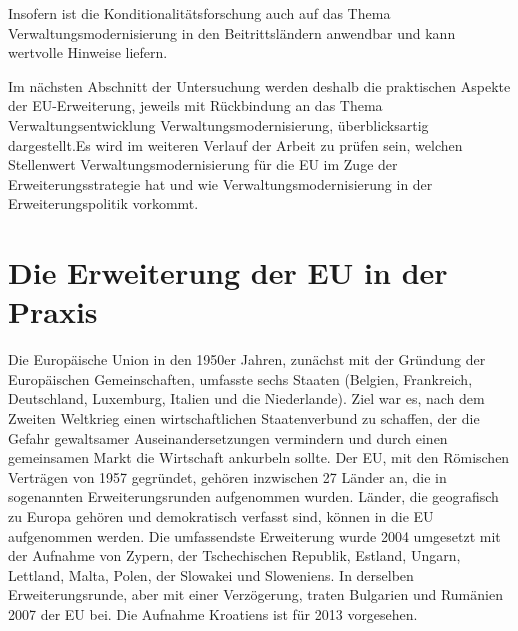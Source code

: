 Insofern ist die Konditionalitätsforschung auch auf das Thema Verwaltungsmodernisierung in den Beitrittsländern anwendbar und kann wertvolle Hinweise liefern. \par
Im nächsten Abschnitt der Untersuchung werden deshalb die praktischen Aspekte der EU-Erweiterung, jeweils mit Rückbindung an das Thema Verwaltungsentwicklung \/ Verwaltungsmodernisierung, überblicksartig dargestellt.Es wird im weiteren Verlauf der Arbeit zu prüfen sein, welchen Stellenwert Verwaltungsmodernisierung für die EU im Zuge der Erweiterungsstrategie hat und wie Verwaltungsmodernisierung in der Erweiterungspolitik vorkommt.
\section{Die Erweiterung der EU in der Praxis }
Die Europäische Union in den 1950er Jahren, zunächst mit der Gründung der Europäischen Gemeinschaften, umfasste sechs Staaten (Belgien, Frankreich, Deutschland, Luxemburg, Italien und die Niederlande). Ziel war es, nach dem Zweiten Weltkrieg einen wirtschaftlichen Staatenverbund zu schaffen, der die Gefahr gewaltsamer Auseinandersetzungen vermindern und durch einen gemeinsamen Markt die Wirtschaft ankurbeln sollte. Der EU, mit den Römischen Verträgen von 1957 gegründet, gehören inzwischen 27 Länder an, die in sogenannten Erweiterungsrunden aufgenommen wurden. Länder, die geografisch zu Europa gehören und demokratisch verfasst sind, können in die EU aufgenommen werden. Die umfassendste Erweiterung wurde 2004 umgesetzt mit der Aufnahme von Zypern, der Tschechischen Republik, Estland, Ungarn, Lettland, Malta, Polen, der Slowakei und Sloweniens. In derselben Erweiterungsrunde, aber mit einer Verzögerung, traten Bulgarien und Rumänien 2007 der EU bei. Die Aufnahme Kroatiens ist für 2013 vorgesehen.\par
\renewcommand{\arraystretch}{1.5}
